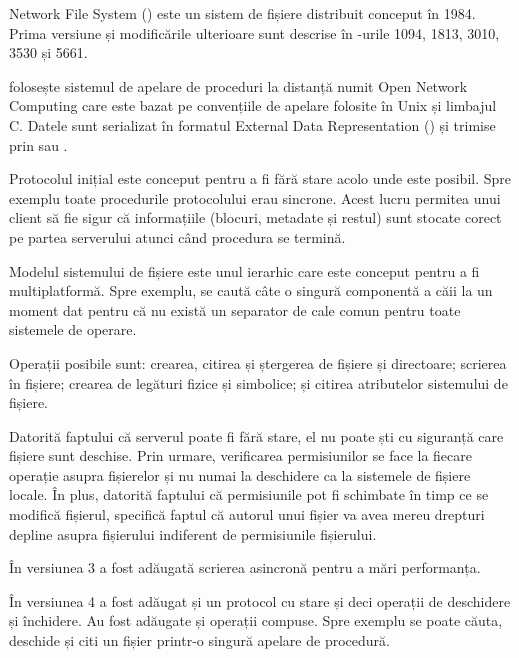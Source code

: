 \documentclass[a4wide,12pt]{report}
\newcommand{\acr}[1]{{\textsmaller[1]{\textsc{#1}}}} %
\begin{document}
Network File System (\acr{NFS}) este un sistem de fișiere distribuit conceput în 1984. Prima versiune și modificările
ulterioare sunt descrise în \acr{RFC}-urile 1094\cite{rfc1094}, 1813, 3010, 3530 și 5661.

\acr{NFS} folosește sistemul de apelare de proceduri la distanță numit Open Network Computing \acr{RPC} care este bazat
pe convențiile de apelare folosite în Unix și limbajul C. Datele sunt serializat în formatul External Data
Representation (\acr{XDR}) și trimise prin \acr{UDP} sau \acr{TCP}.

Protocolul inițial este conceput pentru a fi fără stare acolo unde este posibil. Spre exemplu toate procedurile
protocolului erau sincrone. Acest lucru permitea unui client să fie sigur că informațiile (blocuri, metadate și restul)
sunt stocate corect pe partea serverului atunci când procedura se termină. 

Modelul sistemului de fișiere este unul ierarhic care este conceput pentru a fi multiplatformă. Spre exemplu, se caută
câte o singură componentă a căii la un moment dat pentru că nu există un separator de cale comun pentru toate sistemele
de operare.

Operații posibile sunt: crearea, citirea și ștergerea de fișiere și directoare; scrierea în fișiere; crearea de legături
fizice și simbolice; și citirea atributelor sistemului de fișiere.

Datorită faptului că serverul poate fi fără stare, el nu poate ști cu siguranță care fișiere sunt deschise. Prin urmare,
verificarea permisiunilor se face la fiecare operație asupra fișierelor și nu numai la deschidere ca la sistemele de
fișiere locale. În plus, datorită faptului că permisiunile pot fi schimbate în timp ce se modifică fișierul, \acr{NFS}
specifică faptul că autorul unui fișier va avea mereu drepturi depline asupra fișierului indiferent de permisiunile
fișierului.

În versiunea 3 a fost adăugată scrierea asincronă pentru a mări performanța.

În versiunea 4 a fost adăugat și un protocol cu stare și deci operații de deschidere și închidere. Au fost adăugate și
operații compuse. Spre exemplu se poate căuta, deschide și citi un fișier printr-o singură apelare de procedură.

\subsection{\acr{SMB}} %
\end{document}
